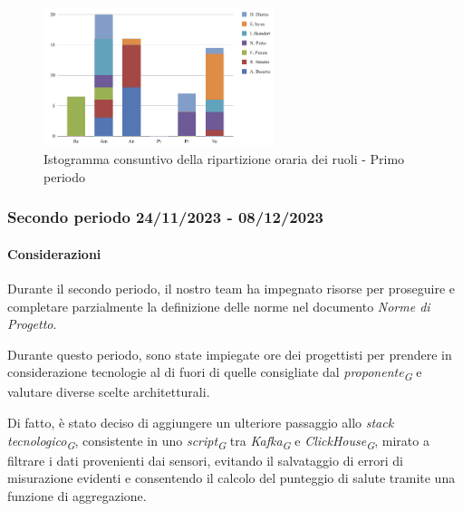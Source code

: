 \vspace{0.6cm}

\begin{figure}[H]
    \centering
    \includegraphics[width=0.6\textwidth]{../Images/graficoCons1.png}
    \caption{Istogramma consuntivo della ripartizione oraria dei ruoli - Primo periodo}
    \label{fig:Consuntivo_ripartizione_oraria_1}
\end{figure}


\subsubsection{Secondo periodo  24/11/2023 - 08/12/2023}
\paragraph{Considerazioni}

Durante il secondo periodo, il nostro team ha impegnato risorse per proseguire e completare parzialmente la definizione delle norme nel documento \textit{Norme di Progetto}.

Durante questo periodo, sono state impiegate ore dei progettisti per prendere in considerazione tecnologie al di fuori di quelle consigliate dal \textit{proponente}\textsubscript{\textit{G}} e valutare diverse scelte architetturali.

Di fatto, è stato deciso di aggiungere un ulteriore passaggio allo \textit{stack tecnologico}\textsubscript{\textit{G}}, consistente in uno \textit{script}\textsubscript{\textit{G}} tra \textit{Kafka}\textsubscript{\textit{G}} e \textit{ClickHouse}\textsubscript{\textit{G}}, mirato a filtrare i dati provenienti dai sensori, evitando il salvataggio di errori di misurazione evidenti e consentendo il calcolo del punteggio di salute tramite una funzione di aggregazione.

\vspace{0.2cm}

